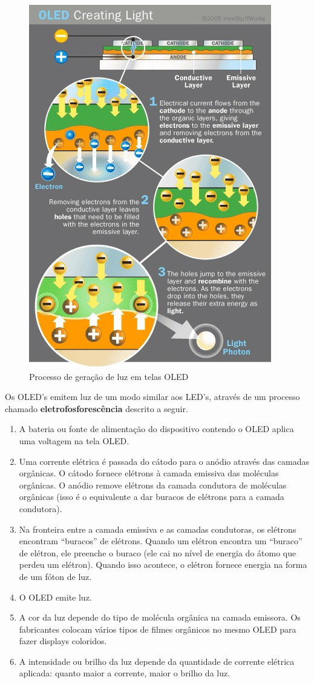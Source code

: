 \begin{figure}[!ht]
  \centering
  \includegraphics[width=.40\textwidth]{./figuras/oled-process} 
  \caption{Processo de geração de luz em telas OLED}
  \label{fig:oled-process} 
\end{figure}

Os OLED's emitem luz de um modo similar aos LED's, através de um processo chamado {\bf eletrofosforescência} descrito a seguir. 

\begin{enumerate}
	\item A bateria ou fonte de alimentação do dispositivo contendo o OLED aplica uma voltagem na tela OLED. 

	\item Uma corrente elétrica é passada do cátodo para o anódio através das camadas orgânicas. O cátodo fornece elétrons à camada emissiva das moléculas orgânicas. O anódio remove elétrons da camada condutora de moléculas orgânicas (isso é o equivalente a dar buracos de elétrons para a camada condutora).

	\item Na fronteira entre a camada emissiva e as camadas condutoras, os elétrons encontram ``buracos'' de elétrons. Quando um elétron encontra um ``buraco'' de elétron, ele preenche o buraco (ele cai no nível de energia do átomo que perdeu um elétron). Quando isso acontece, o elétron fornece energia na forma de um fóton de luz. 

	\item O OLED emite luz. 

	\item A cor da luz depende do tipo de molécula orgânica na camada emissora. Os fabricantes colocam vários tipos de filmes orgânicos no mesmo OLED para fazer displays coloridos.

	\item A intensidade ou brilho da luz depende da quantidade de corrente elétrica aplicada: quanto maior a corrente, maior o brilho da luz.
\end{enumerate}

